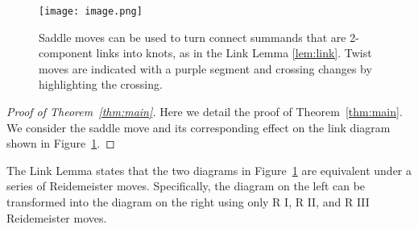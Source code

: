 \documentclass[11pt]{article}
\begin{document}
\begin{figure}[h]
    \centering
    \texttt{[image: image.png]} %
    \caption{Saddle moves can be used to turn connect summands that are 2-component links into knots, as in the Link Lemma \ref{lem:link}. Twist moves are indicated with a purple segment and crossing changes by highlighting the crossing.}
    \label{fig:saddle_moves}
\end{figure}

\begin{proof}[Proof of Theorem~\ref{thm:main}]
Here we detail the proof of Theorem~\ref{thm:main}. We consider the saddle move and its corresponding effect on the link diagram shown in Figure~\ref{fig:saddle_moves}.
\end{proof}

\begin{lemma} \label{lem:link}
The Link Lemma states that the two diagrams in Figure~\ref{fig:saddle_moves} are equivalent under a series of Reidemeister moves. Specifically, the diagram on the left can be transformed into the diagram on the right using only R I, R II, and R III Reidemeister moves.
\end{lemma}
\end{document}
